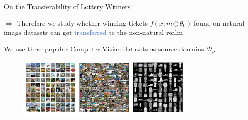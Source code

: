 \documentclass{beamer}
\begin{document}
\begin{frame}{On the Transferability of Lottery Winners}

	$\Rightarrow$ Therefore we study whether winning tickets $f(x;m \odot \theta_0)$
	found on natural image datasets can get \textcolor{RoyalBlue}{transferred} to the non-natural realm

	\bigskip

	We use three popular Computer Vision datasets as source domains $\mathcal{D}_S$

	\begin{figure}
 \includegraphics[width=0.8\textwidth]{figures/fashion_mnist}
\end{figure}
\end{frame}
\end{document}
